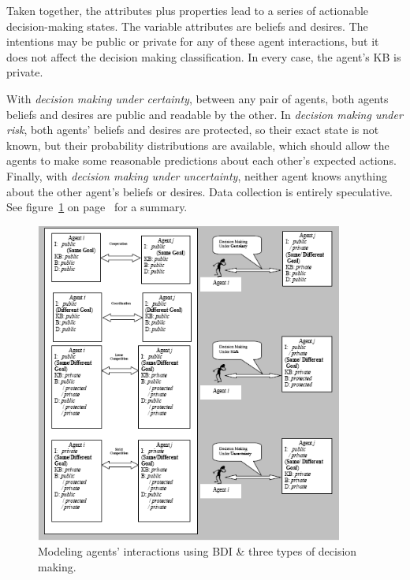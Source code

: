 \documentclass[11pt,letterpaper,onecolumn,twoside,openright,final]{report}
\begin{document}
Taken together, the attributes plus properties lead to a series of actionable decision-making states.
The variable attributes are beliefs and desires.
The intentions may be public or private for any of these agent interactions, but it does not affect the decision making classification.
In every case, the agent's KB is private.

With \emph{decision making under certainty}, between any pair of agents, both agents beliefs and desires are public and readable by the other.
In \emph{decision making under risk}, both agents' beliefs and desires are protected, so their exact state is not known, but their probability distributions are available, which should allow the agents to make some reasonable predictions about each other's expected actions.
Finally, with \emph{decision making under uncertainty}, neither agent knows anything about the other agent's beliefs or desires.
Data collection is entirely speculative. See figure~\ref{fig:uncertainty-management} on page~\pageref{fig:uncertainty-management} for a summary.

\begin{figure}[h]
  \includegraphics[width=0.9\textwidth]{figures/uncertainty-management}
  \caption{Modeling agents' interactions using BDI \& three types of decision making.}
  \label{fig:uncertainty-management}
\end{figure}
\end{document}
